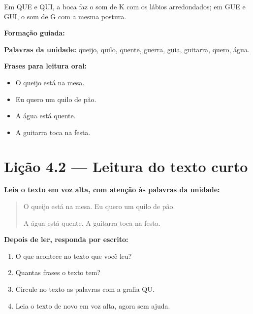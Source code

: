 \begin{boquinha}
Em QUE e QUI, a boca faz o som de K com os lábios arredondados; em GUE e GUI, o som de G com a mesma postura.
\end{boquinha}

\noindent\textbf{Formação guiada:}

\begin{center}
\end{center}

\noindent\textbf{Palavras da unidade:} queijo, quilo, quente, guerra, guia, guitarra, quero, água.

\noindent\textbf{Frases para leitura oral:}
\begin{itemize}[leftmargin=1.6em]
  \item O queijo está na mesa.
  \item Eu quero um quilo de pão.
  \item A água está quente.
  \item A guitarra toca na festa.
\end{itemize}

\section{Lição 4.2 --- Leitura do texto curto}

\noindent\textbf{Leia o texto em voz alta, com atenção às palavras da unidade:}


\begin{quote}
O queijo está na mesa. Eu quero um quilo de pão.

A água está quente. A guitarra toca na festa.
\end{quote}

\textbf{Depois de ler, responda por escrito:}
\begin{enumerate}

  \item O que acontece no texto que você leu?
  \begin{center}
  \underline{\hspace{12cm}}
  \end{center}

  \item Quantas frases o texto tem?
  \begin{center}
  \underline{\hspace{12cm}}
  \end{center}

  \item Circule no texto as palavras com a grafia QU.

  \item Leia o texto de novo em voz alta, agora sem ajuda.

\end{enumerate}

